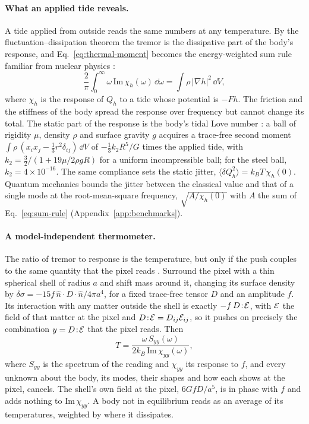 \paragraph{What an applied tide reveals.} A tide applied from outside reads the same
numbers at any temperature. By the fluctuation--dissipation theorem
\cite{CallenWelton1951} the tremor is the dissipative part of the body's
response, and Eq.~\eqref{eq:thermal-moment} becomes the energy-weighted sum rule
familiar from nuclear physics \cite{LippariniStringari1989}:
\begin{equation}\label{eq:sum-rule}
\frac{2}{\pi}\int_0^\infty\omega\,\mathrm{Im}\,\chi_h(\omega)\,\dd\omega
= \int\rho\,|\nabla h|^2\,\dd V ,
\end{equation}
where $\chi_h$ is the response of $Q_h$ to a tide whose potential is $-F h$.
The friction and the stiffness of the body spread the response over frequency
but cannot change its total. The static part of the response is the body's
tidal Love number \cite{Love1909}: a ball of rigidity $\mu$, density $\rho$ and
surface gravity $g$ acquires a trace-free second moment $\int\rho\,(x_ix_j - \tfrac13r^2\delta_{ij})\,\dd V$ of $-\tfrac13 k_2R^5/G$ times the applied
tide, with $k_2 = \tfrac32/(1 + 19\mu/2\rho g R)$ for a uniform incompressible ball; for the
steel ball, $k_2 = 4\times10^{-16}$. The same compliance sets the static
jitter, $\langle\delta Q_h^2\rangle = k_BT\,\chi_h(0)$. Quantum mechanics
bounds the jitter between the classical value and that of a single mode at the
root-mean-square frequency, $\sqrt{A/\chi_h(0)}$ with $A$ the sum of
Eq.~\eqref{eq:sum-rule} (Appendix~\ref{app:benchmarks}).

\paragraph{A model-independent thermometer.} The ratio of tremor to response
is the temperature, but only if the push couples to the same quantity that the
pixel reads \cite{Levin1998}. Surround the pixel with a thin spherical shell
of radius $a$ and shift mass around it, changing its surface density by
$\delta\sigma = -15f\,\hat n\cdot D\cdot\hat n/4\pi a^4$, for a fixed
trace-free tensor $D$ and an amplitude $f$. Its interaction with any matter
outside the shell is exactly $-f\,D\!:\!\mathcal{E}$, with $\mathcal{E}$ the field of that
matter at the pixel and $D\!:\!\mathcal{E} = D_{ij}\mathcal{E}_{ij}$, so it pushes
on precisely the combination $y = D\!:\!\mathcal{E}$ that the pixel reads. Then
\begin{equation}\label{eq:thermometer}
T = \frac{\omega\,S_{yy}(\omega)}{2k_B\,\mathrm{Im}\,\chi_{yy}(\omega)} ,
\end{equation}
where $S_{yy}$ is the spectrum of the reading and $\chi_{yy}$ its response to
$f$, and every unknown about the body, its modes, their shapes and how each
shows at the pixel, cancels. The shell's own field at the pixel,
$6Gf D/a^5$, is in phase with $f$ and adds nothing to $\mathrm{Im}\,\chi_{yy}$.
A body not in equilibrium reads as an average of its temperatures, weighted by
where it dissipates.

